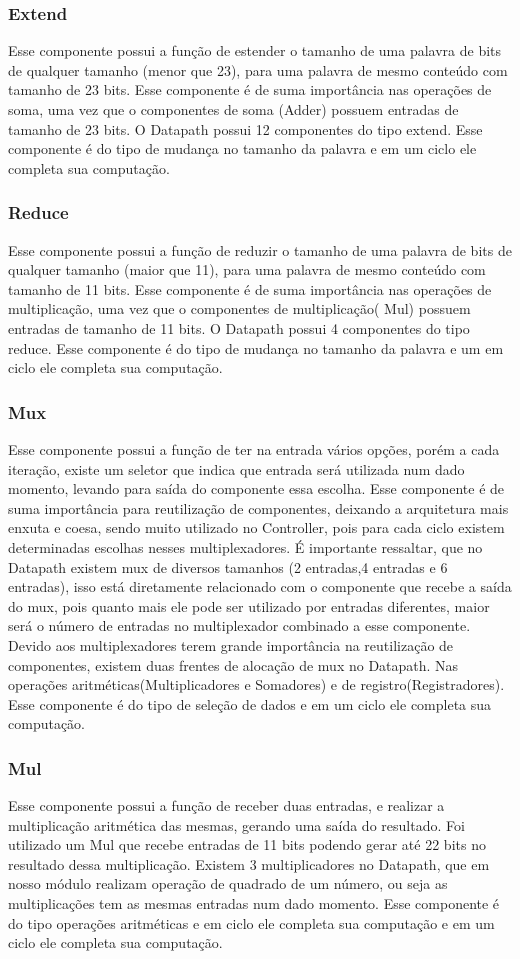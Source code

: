 \subsubsection{Extend}
Esse componente possui a função de estender o tamanho de uma palavra de bits de qualquer tamanho (menor que 23), para uma palavra de mesmo conteúdo com tamanho de 23 bits. Esse componente é de suma importância nas operações de soma, uma vez que o componentes de soma (Adder) possuem entradas de tamanho de 23 bits. O Datapath possui 12 componentes do tipo extend. Esse componente é do tipo de mudança no tamanho da palavra e em um ciclo ele completa sua computação.	
\subsubsection{Reduce}
Esse componente possui a função de reduzir o tamanho de uma palavra de bits de qualquer tamanho (maior que 11), para uma palavra de mesmo conteúdo com tamanho de 11 bits. Esse componente é de suma importância nas operações de multiplicação, uma vez que o componentes de multiplicação( Mul) possuem entradas de tamanho de 11 bits. O Datapath possui 4 componentes do tipo reduce. Esse componente é do tipo de mudança no tamanho da palavra e um em ciclo ele completa sua computação.	
\subsubsection{Mux}
Esse componente possui a função de ter na entrada vários opções, porém a cada iteração, existe um seletor que indica que entrada será utilizada num dado momento, levando para saída do componente essa escolha. Esse componente é de suma importância para reutilização de componentes, deixando a arquitetura mais enxuta e coesa, sendo muito utilizado no Controller, pois para cada ciclo existem determinadas escolhas nesses multiplexadores. É importante ressaltar, que no Datapath existem mux de diversos tamanhos (2 entradas,4 entradas e 6 entradas), isso está diretamente relacionado com o componente que recebe a saída do mux, pois quanto mais ele pode ser utilizado por entradas diferentes, maior será o número de entradas no multiplexador combinado a esse componente. Devido aos multiplexadores terem grande importância na reutilização de componentes, existem duas frentes de alocação de mux no Datapath. Nas operações aritméticas(Multiplicadores e Somadores) e de registro(Registradores). Esse componente é do tipo de seleção de dados e em um ciclo ele completa sua computação.	
\subsubsection{Mul}
Esse componente possui a função de receber duas entradas, e realizar a multiplicação aritmética das mesmas, gerando uma saída do resultado. Foi utilizado um Mul que recebe entradas de 11 bits podendo gerar até 22 bits no resultado dessa multiplicação. Existem 3 multiplicadores no Datapath, que em nosso módulo realizam operação de quadrado de um número, ou seja as multiplicações tem as mesmas entradas num dado momento. Esse componente é do tipo operações aritméticas e em ciclo ele completa sua computação e em um ciclo ele completa sua computação.

